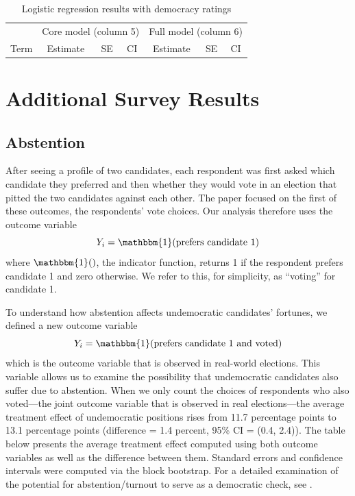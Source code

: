 \documentclass[12pt]{article}
\begin{document}
\begin{table}[ht]
\footnotesize
\centering
\caption{Logistic regression results with democracy ratings}
\label{tab:structureLogit}
\begin{tabular}{lcccccc}
\toprule
& \multicolumn{3}{c}{Core model (column 5)} & \multicolumn{3}{c}{Full model (column 6)} \\
Term & Estimate & SE & CI & Estimate & SE & CI \\
\midrule

\bottomrule
\end{tabular}
\end{table}

\clearpage
\newpage


\section{Additional Survey Results}
\setcounter{figure}{0} 
\setcounter{table}{0} 

\onehalfspacing

\subsection{Abstention}

After seeing a profile of two candidates, each respondent was first asked which candidate they preferred and then whether they would vote in an election that pitted the two candidates against each other. The paper focused on the first of these outcomes, the respondents' vote choices. Our analysis therefore uses the outcome variable
$$ Y_i = \mathbbm{1}(\text{prefers candidate 1}) $$
where $\mathbbm{1}()$, the indicator function, returns 1 if the respondent prefers candidate 1 and zero otherwise. We refer to this, for simplicity, as ``voting'' for candidate 1.

To understand how abstention affects undemocratic candidates' fortunes, we defined a new outcome variable
$$ Y_i = \mathbbm{1}(\text{prefers candidate 1 and voted}) $$
which is the outcome variable that is observed in real-world elections. This variable allows us to examine the possibility that undemocratic candidates also suffer due to abstention. When we only count the choices of respondents who also voted---the joint outcome variable that is observed in real elections---the average treatment effect of undemocratic positions rises from 11.7 percentage points to 13.1 percentage points (difference = 1.4 percent, 95\% CI = (0.4, 2.4)). The table below presents the average treatment effect computed using both outcome variables as well as the difference between them. Standard errors and confidence intervals were computed via the block bootstrap.
For a detailed examination of the potential for abstention/turnout to serve as a democratic check, see \citet{GrahamSvolik2019}.

\end{document}
